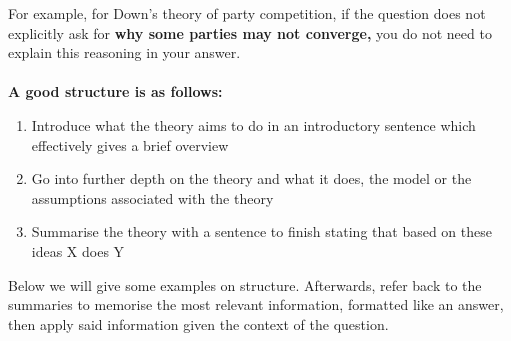 \documentclass[12pt, letterpaper]{article}
\begin{document}
For example, for Down's theory of party competition, if the question does not explicitly ask for \textbf{why some parties may not converge,} you do not need to explain this reasoning in your answer.\\\\
\textbf{A good structure is as follows:}
\begin{enumerate}
	\item Introduce what the theory aims to do in an introductory sentence which effectively gives a brief overview
	\item Go into further depth on the theory and what it does, the model or the assumptions associated with the theory
	\item Summarise the theory with a sentence to finish stating that based on these ideas X does Y
\end{enumerate}
Below we will give some examples on structure. Afterwards, refer back to the summaries to memorise the most relevant information, formatted like an answer, then apply said information given the context of the question.
\end{document}
